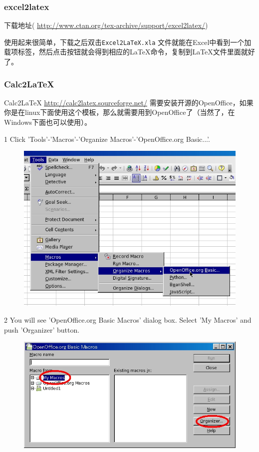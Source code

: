 \subsubsection{excel2latex}

下载地址( \url{http://www.ctan.org/tex-archive/support/excel2latex/})

使用起来很简单，下载之后双击\texttt{Excel2LaTeX.xla} 文件就能在Excel中看到一个加载项标签，然后点击按钮就会得到相应的LaTeX命令，复制到LaTeX文件里面就好了。

\subsubsection{Calc2LaTeX}

Calc2LaTeX
\url{http://calc2latex.sourceforge.net/} 需要安装开源的OpenOffice，如果你是在linux下面使用这个模板，那么就需要用到OpenOffice了（当然了，在Windows下面也可以使用）。

1 Click 'Tools'-'Macros'-'Organize Macros'-'OpenOffice.org Basic...'. 
\begin{figure}[h]
\centering
\includegraphics[scale=0.4]{figs/step1_oo20}
\end{figure}

2 You will see 'OpenOffice.org Basic Macros' dialog box. Select 'My Macros' and push 'Organizer' button.
\begin{figure}[h]
\centering
\includegraphics[scale=0.4]{figs/step2_oo20}
\end{figure}

